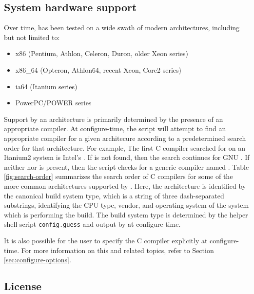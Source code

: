 \subsection{System hardware support}


Over time, \libflame has been tested on a wide swath of modern architectures,
including but not limited to:
\begin{itemize}
\item x86 (Pentium, Athlon, Celeron, Duron, older Xeon series)
\item x86\_64 (Opteron, Athlon64, recent Xeon, Core2 series)
\item ia64 (Itanium series)
\item PowerPC/POWER series
\end{itemize}
Support by an architecture is primarily determined by the presence of an
appropriate compiler.
At configure-time, the \configure script will attempt to find an appropriate
compiler for a given architecure according to a predetermined search order
for that architecture.
For example, The first C compiler searched for on an Itanium2 system is Intel's
\iccns.
If \icc is not found, then the search continues for GNU \gcc.
If neither \icc nor \gcc is present, then the script checks for a generic
compiler named \ccns.
Table \ref{fig:search-order} summarizes the search order of C
compilers for some of the more common architectures supported by \libflamens.
Here, the architecture is identified by the canonical build system type, which
is a string of three dash-separated substrings, identifying the CPU type,
vendor, and operating system of the system which is performing the build.
The build system type is determined by the helper shell script
{\tt config.guess} and output by \configure at configure-time.

It is also possible for the user to specify the C compiler
explicitly at configure-time.
For more information on this and related topics, refer to Section
\ref{sec:configure-options}.





\subsection{License}





